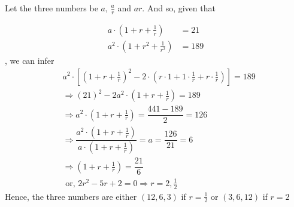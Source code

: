 \begin{solution}
	Let the three numbers be $a$, $\frac{a}{r}$ and $ar$. And so, given that
	
	\begin{align}
		a\cdot\left( 1 + r + \frac{1}{r} \right) &= 21 \\
		a^2\cdot\left( 1 + r^2 + \frac{1}{r^2} \right) &= 189
	\end{align}
	, we can infer 
	\begin{align}
		&a^2\cdot\left[ \left( 1 + r + \frac{1}{r} \right)^2 - 
		2\cdot\left( r\cdot1 + 1\cdot\frac{1}{r} + r\cdot\frac{1}{r} \right)\right] = 189 \\
		&\Rightarrow (21)^2 - 2a^2\cdot\left( 1 + r + \frac{1}{r} \right) = 189 \\
		&\Rightarrow a^2\cdot\left( 1 + r + \frac{1}{r} \right) = \dfrac{441-189}{2} = 126 \\
		&\Rightarrow \dfrac{a^2\cdot\left( 1 + r + \frac{1}{r} \right)}
		{a\cdot\left( 1 + r + \frac{1}{r} \right)} = a = \dfrac{126}{21} = 6 \\
		&\Rightarrow \left( 1 + r + \frac{1}{r} \right) = \dfrac{21}{6} \\
		&\text{ or, } 2r^2 - 5r + 2 = 0 \Rightarrow r = 2, \frac{1}{2}
	\end{align}
	Hence, the three numbers are either $(12,6,3)$ if $r=\frac{1}{2}$ or $(3,6,12)$ if $r=2$
\end{solution}
